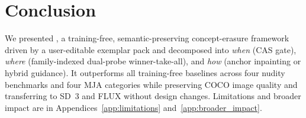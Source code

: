 \section{Conclusion}

We presented \ours{}, a training-free, semantic-preserving concept-erasure framework driven by a user-editable exemplar pack and decomposed into \emph{when} (CAS gate), \emph{where} (family-indexed dual-probe winner-take-all), and \emph{how} (anchor inpainting or hybrid guidance). It outperforms all training-free baselines across four nudity benchmarks and four MJA categories while preserving COCO image quality and transferring to SD~3 and FLUX without design changes. Limitations and broader impact are in Appendices~\ref{app:limitations} and~\ref{app:broader_impact}.

